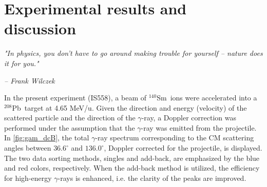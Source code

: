 \documentclass[twoside,english]{uiofysmaster/uiofysmaster}
\newcommand{\Sm}{$^{140}$Sm} %
\newcommand{\Pb}{$^{208}$Pb}
\newcommand{\ga}{$\gamma$}
\let\orgautoref\autoref
\renewcommand{\autoref}
        {%
		 \def\sectionautorefname{Section}%
		 \def\subsectionautorefname{Section}%
		 \def\subsubsectionautorefname{Section}%
		 \def\chapterautorefname{Chapter}%
          \orgautoref}
\begin{document}
%		
%		




\chapter{Experimental results and discussion}\label{ch:results}
\epigraph{\textit{"In physics, you don't have to go around making trouble for yourself – nature does it for you."}}{\textit{– Frank Wilczek}}


In the present experiment (IS558), a beam of \Sm\ ions were accelerated into a \Pb\ target at 4.65 MeV/u.
Given the direction and energy (velocity) of the scattered particle and the direction of the \ga-ray, a Doppler correction was performed under the assumption that the \ga-ray was emitted from the projectile.
In \autoref{fig:gam_dcB}, the total \ga-ray spectrum corresponding to the CM scattering angles between $36.6^\circ$ and $136.0^\circ$, Doppler corrected for the projectile, is displayed.
The two data sorting methods, singles and add-back, are emphasized by the blue and red colors, respectively.
When the add-back method is utilized, the efficiency for high-energy \ga-rays is enhanced, i.e. the clarity of the peaks are improved.
\end{document}
